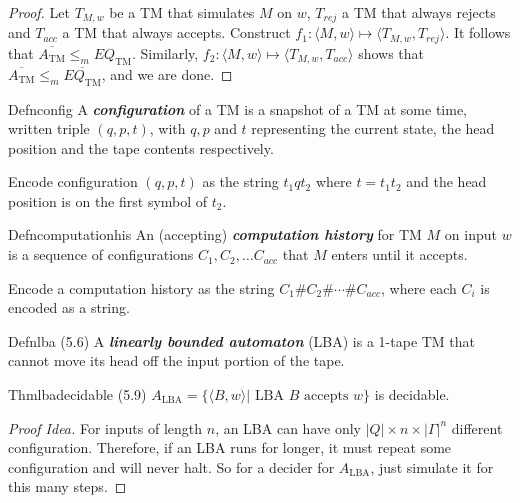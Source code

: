 \begin{proof}
  Let $T_{M,w}$ be a TM that simulates $M$ on $w$, $T_{rej}$ a TM that always rejects and $T_{acc}$ a TM that always accepts. Construct $f_1:\langle M,w\rangle\mapsto\langle T_{M,w},T_{rej}\rangle$. It follows that $\overline{A_{\mathrm{TM}}}\leq_m EQ_{\mathrm{TM}}$. Similarly, $f_2:\langle M,w\rangle\mapsto\langle T_{M,w},T_{acc}\rangle$ shows that $\overline{A_{\mathrm{TM}}}\leq_m \overline{EQ_{\mathrm{TM}}}$, and we are done.
\end{proof}

\begin{reference}{Defn}{config}
  A \textbf{\textit{configuration}} of a TM is a snapshot of a TM at some time, written triple $(q,p,t)$, with $q,p$ and $t$ representing the current state, the head position and the tape contents respectively.
\end{reference}

Encode configuration $(q,p,t)$ as the string $t_1qt_2$ where $t = t_1t_2$ and the head position is on the first symbol of $t_2$.

\begin{reference}{Defn}{computationhis}
  An (accepting) \textbf{\textit{computation history}} for TM $M$ on input $w$ is a sequence of configurations $C_1,C_2,\dots C_{acc}$ that $M$ enters until it accepts.
\end{reference}

Encode a computation history as the string $C_1\# C_2\# \cdots\# C_{acc}$, where each $C_i$ is encoded as a string.

\begin{reference}{Defn}{lba}
  (5.6) A \textbf{\textit{linearly bounded automaton}} (LBA) is a 1-tape TM that cannot move its head off the input portion of the tape.
\end{reference}

\begin{reference}{Thm}{lbadecidable}
  (5.9) $A_{\mathrm{LBA}}=\{\langle B,w\rangle|\text{ LBA }B\text{ accepts }w\}$ is decidable.
\end{reference}

\begin{proof}[Proof Idea]
  For inputs of length $n$, an LBA can have only $|Q|\times n\times|\Gamma|^n$ different configuration. Therefore, if an LBA runs for longer, it must repeat some configuration and will never halt. So for a decider for $A_{\mathrm{LBA}}$, just simulate it for this many steps.
\end{proof}

